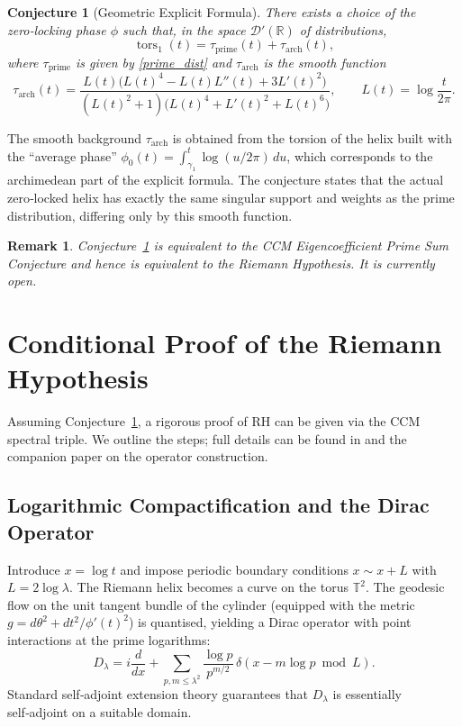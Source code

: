 \documentclass[12pt,a4paper,oneside]{book}
\newtheorem{conjecture}[theorem]{Conjecture}
\newtheorem{remark}[theorem]{Remark}
\newcommand{\R}{\mathbb{R}}
\newcommand{\dist}{\mathcal{D}'}
\newcommand{\tors}{\operatorname{tors}}
\begin{document}
\begin{conjecture}[Geometric Explicit Formula]\label{conj:GEF}
There exists a choice of the zero‑locking phase \(\phi\) such that, in the space \(\dist(\R)\) of distributions,
\[
\tors_1(t) = \tau_{\text{prime}}(t) + \tau_{\text{arch}}(t),
\tag{5}
\]
where \(\tau_{\text{prime}}\) is given by \eqref{prime_dist} and \(\tau_{\text{arch}}\) is the smooth function
\[
\tau_{\text{arch}}(t) = \frac{L(t)\bigl(L(t)^4 - L(t)L''(t) + 3L'(t)^2\bigr)}
                            {(L(t)^2+1)\bigl(L(t)^4 + L'(t)^2 + L(t)^6\bigr)},
\qquad L(t)=\log\frac{t}{2\pi}. \tag{6}
\]
\end{conjecture}

The smooth background \(\tau_{\text{arch}}\) is obtained from the torsion of the helix built with the ``average phase'' \(\phi_0(t) = \int_{\gamma_1}^t \log(u/2\pi)\,du\), which corresponds to the archimedean part of the explicit formula.  The conjecture states that the actual zero‑locked helix has exactly the same singular support and weights as the prime distribution, differing only by this smooth function.

\begin{remark}
Conjecture~\ref{conj:GEF} is equivalent to the CCM Eigencoefficient Prime Sum Conjecture \cite{CCM} and hence is equivalent to the Riemann Hypothesis.  It is currently open.
\end{remark}

\section{Conditional Proof of the Riemann Hypothesis}
Assuming Conjecture~\ref{conj:GEF}, a rigorous proof of RH can be given via the CCM spectral triple.  We outline the steps; full details can be found in \cite{CCM} and the companion paper on the operator construction.

\subsection{Logarithmic Compactification and the Dirac Operator}
Introduce \(x = \log t\) and impose periodic boundary conditions \(x\sim x+L\) with \(L=2\log\lambda\).  The Riemann helix becomes a curve on the torus \(\mathbb{T}^2\).  The geodesic flow on the unit tangent bundle of the cylinder (equipped with the metric \(g = d\theta^2 + dt^2/\phi'(t)^2\)) is quantised, yielding a Dirac operator with point interactions at the prime logarithms:
\[
D_\lambda = i\frac{d}{dx} + \sum_{p,m\le\lambda^2} \frac{\log p}{p^{m/2}} \,\delta(x - m\log p \bmod L).
\]
Standard self‑adjoint extension theory \cite{Albeverio} guarantees that \(D_\lambda\) is essentially self‑adjoint on a suitable domain.
\end{document}
